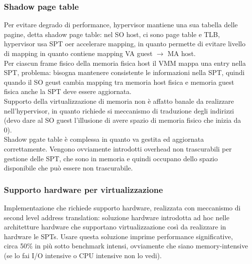 \documentclass{article}
\begin{document}
\subsubsection{Shadow page table}
Per evitare degrado di performance, hypervisor mantiene una sua tabella delle pagine, detta shadow page table: nel SO host, ci sono page table e TLB, hypervisor usa SPT oer accelerare mapping, in quanto permette di evitare livello di mapping in quanto contiene mapping VA guest $\rightarrow$ MA host.\\ Per ciascun frame fisico della memoria fisica host il VMM mappa una entry nella SPT, problema: bisogna mantenere consistente le informazioni nella SPT, quindi quando il SO geust cambia mapping tra memoria host fisica e memoria guest fisica anche la SPT deve essere aggiornata.\\ Supporto della virtualizzazione di memoria non è affatto banale da realizzare nell'hypervisor, in quanto richiede si meccanismo di traduzione degli indirizzi (devo dare al SO guest l'illusione di avere spazio di memoria fisico che inizia da 0).\\ Shadow pgate table è complessa in quanto va gestita ed aggiornata correttamente. Vengono ovviamente introdotti overhead non trascurabili per gestione delle SPT, che sono in memoria e quindi occupano dello spazio disponibile che può essere non trascurabile.
\subsubsection{Supporto hardware per virtualizzazione}
Implementazione che richiede supporto hardware, realizzata con meccanismo di second level address translation: soluzione hardware introdotta ad hoc nelle architetture hardware che supportano virtualizzazione così da realizzare in hardware le SPTs. Usare questa soluzione imprime performance significative, circa 50\% in più sotto benchmark intensi, ovviamente che siano memory-intensive (se lo fai I/O intensive o CPU intensive non lo vedi).
\end{document}
